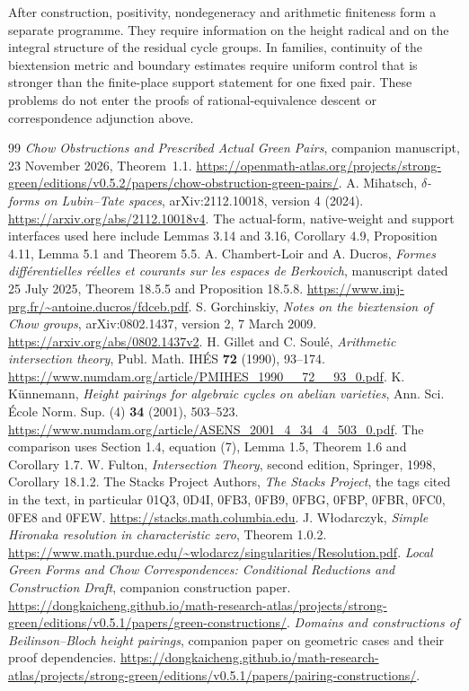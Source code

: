 \documentclass[11pt,a4paper]{article}
\theoremstyle{definition}
\theoremstyle{remark}
\numberwithin{equation}{section}
\begin{document}
After construction, positivity, nondegeneracy and arithmetic finiteness form a separate programme. They require information on the height radical and on the integral structure of the residual cycle groups. In families, continuity of the biextension metric and boundary estimates require uniform control that is stronger than the finite-place support statement for one fixed pair. These problems do not enter the proofs of rational-equivalence descent or correspondence adjunction above.


\begin{thebibliography}{99}
 \emph{Chow Obstructions and Prescribed Actual Green Pairs}, companion manuscript, 23 November 2026, Theorem~1.1. \url{https://openmath-atlas.org/projects/strong-green/editions/v0.5.2/papers/chow-obstruction-green-pairs/}.
 A. Mihatsch, \emph{$\delta$-forms on Lubin--Tate spaces}, arXiv:2112.10018, version 4 (2024). \url{https://arxiv.org/abs/2112.10018v4}. The actual-form, native-weight and support interfaces used here include Lemmas 3.14 and 3.16, Corollary 4.9, Proposition 4.11, Lemma 5.1 and Theorem 5.5.
 A. Chambert-Loir and A. Ducros, \emph{Formes diff\'erentielles r\'eelles et courants sur les espaces de Berkovich}, manuscript dated 25 July 2025, Theorem 18.5.5 and Proposition 18.5.8. \url{https://www.imj-prg.fr/~antoine.ducros/fdceb.pdf}.
 S. Gorchinskiy, \emph{Notes on the biextension of Chow groups}, arXiv:0802.1437, version 2, 7 March 2009. \url{https://arxiv.org/abs/0802.1437v2}.
 H. Gillet and C. Soul\'e, \emph{Arithmetic intersection theory}, Publ. Math. IH\'ES \textbf{72} (1990), 93--174. \url{https://www.numdam.org/article/PMIHES_1990__72__93_0.pdf}.
 K. K\"unnemann, \emph{Height pairings for algebraic cycles on abelian varieties}, Ann. Sci. \'Ecole Norm. Sup. (4) \textbf{34} (2001), 503--523. \url{https://www.numdam.org/article/ASENS_2001_4_34_4_503_0.pdf}. The comparison uses Section 1.4, equation (7), Lemma 1.5, Theorem 1.6 and Corollary 1.7.
 W. Fulton, \emph{Intersection Theory}, second edition, Springer, 1998, Corollary 18.1.2.
 The Stacks Project Authors, \emph{The Stacks Project}, the tags cited in the text, in particular 01Q3, 0D4I, 0FB3, 0FB9, 0FBG, 0FBP, 0FBR, 0FC0, 0FE8 and 0FEW. \url{https://stacks.math.columbia.edu}.
 J. W\l odarczyk, \emph{Simple Hironaka resolution in characteristic zero}, Theorem 1.0.2. \url{https://www.math.purdue.edu/~wlodarcz/singularities/Resolution.pdf}.
 \emph{Local Green Forms and Chow Correspondences: Conditional Reductions and Construction Draft}, companion construction paper. \url{https://dongkaicheng.github.io/math-research-atlas/projects/strong-green/editions/v0.5.1/papers/green-constructions/}.
 \emph{Domains and constructions of Beilinson--Bloch height pairings}, companion paper on geometric cases and their proof dependencies. \url{https://dongkaicheng.github.io/math-research-atlas/projects/strong-green/editions/v0.5.1/papers/pairing-constructions/}.
\end{thebibliography}
\end{document}

